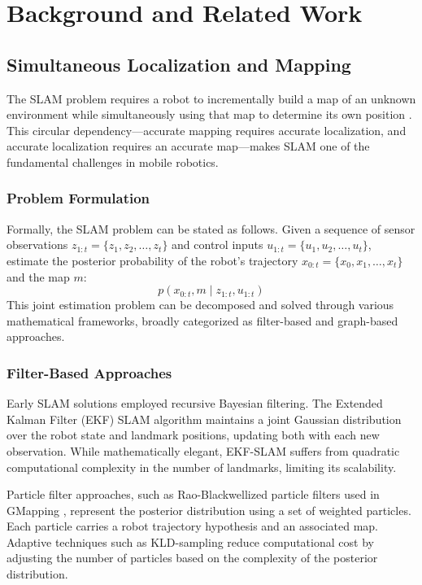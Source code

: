 \chapter{Background and Related Work}
\label{ch:background}

\section{Simultaneous Localization and Mapping}

The SLAM problem requires a robot to incrementally build a map of an unknown environment while simultaneously using that map to determine its own position \citep{thrun2005probabilistic}. This circular dependency---accurate mapping requires accurate localization, and accurate localization requires an accurate map---makes SLAM one of the fundamental challenges in mobile robotics.

\subsection{Problem Formulation}

Formally, the SLAM problem can be stated as follows. Given a sequence of sensor observations $z_{1:t} = \{z_1, z_2, \ldots, z_t\}$ and control inputs $u_{1:t} = \{u_1, u_2, \ldots, u_t\}$, estimate the posterior probability of the robot's trajectory $x_{0:t} = \{x_0, x_1, \ldots, x_t\}$ and the map $m$:
\begin{equation}
p(x_{0:t}, m \mid z_{1:t}, u_{1:t})
\end{equation}
This joint estimation problem can be decomposed and solved through various mathematical frameworks, broadly categorized as filter-based and graph-based approaches.

\subsection{Filter-Based Approaches}

Early SLAM solutions employed recursive Bayesian filtering. The Extended Kalman Filter (EKF) SLAM algorithm maintains a joint Gaussian distribution over the robot state and landmark positions, updating both with each new observation. While mathematically elegant, EKF-SLAM suffers from quadratic computational complexity in the number of landmarks, limiting its scalability.

Particle filter approaches, such as Rao-Blackwellized particle filters used in GMapping \citep{grisetti2010gmapping}, represent the posterior distribution using a set of weighted particles. Each particle carries a robot trajectory hypothesis and an associated map. Adaptive techniques such as KLD-sampling \citep{fox2003kld} reduce computational cost by adjusting the number of particles based on the complexity of the posterior distribution.

